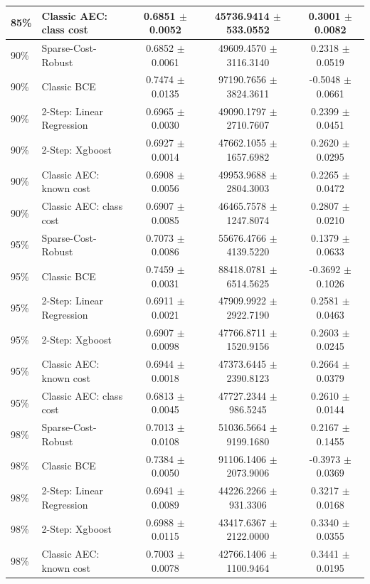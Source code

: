 \begin{tabular}{l l c c c}
85\%  & Classic AEC: class cost & 0.6851 $\pm$ 0.0052 & 45736.9414 $\pm$ 533.0552 & 0.3001 $\pm$ 0.0082 \\
\midrule
90\%  & Sparse-Cost-Robust & 0.6852 $\pm$ 0.0061 & 49609.4570 $\pm$ 3116.3140 & 0.2318 $\pm$ 0.0519 \\
90\%  & Classic BCE & 0.7474 $\pm$ 0.0135 & 97190.7656 $\pm$ 3824.3611 & -0.5048 $\pm$ 0.0661 \\
90\%  & 2-Step: Linear Regression & 0.6965 $\pm$ 0.0030 & 49090.1797 $\pm$ 2710.7607 & 0.2399 $\pm$ 0.0451 \\
90\%  & 2-Step: Xgboost & 0.6927 $\pm$ 0.0014 & 47662.1055 $\pm$ 1657.6982 & 0.2620 $\pm$ 0.0295 \\
90\%  & Classic AEC: known cost & 0.6908 $\pm$ 0.0056 & 49953.9688 $\pm$ 2804.3003 & 0.2265 $\pm$ 0.0472 \\
90\%  & Classic AEC: class cost & 0.6907 $\pm$ 0.0085 & 46465.7578 $\pm$ 1247.8074 & 0.2807 $\pm$ 0.0210 \\
\midrule
95\%  & Sparse-Cost-Robust & 0.7073 $\pm$ 0.0086 & 55676.4766 $\pm$ 4139.5220 & 0.1379 $\pm$ 0.0633 \\
95\%  & Classic BCE & 0.7459 $\pm$ 0.0031 & 88418.0781 $\pm$ 6514.5625 & -0.3692 $\pm$ 0.1026 \\
95\%  & 2-Step: Linear Regression & 0.6911 $\pm$ 0.0021 & 47909.9922 $\pm$ 2922.7190 & 0.2581 $\pm$ 0.0463 \\
95\%  & 2-Step: Xgboost & 0.6907 $\pm$ 0.0098 & 47766.8711 $\pm$ 1520.9156 & 0.2603 $\pm$ 0.0245 \\
95\%  & Classic AEC: known cost & 0.6944 $\pm$ 0.0018 & 47373.6445 $\pm$ 2390.8123 & 0.2664 $\pm$ 0.0379 \\
95\%  & Classic AEC: class cost & 0.6813 $\pm$ 0.0045 & 47727.2344 $\pm$ 986.5245 & 0.2610 $\pm$ 0.0144 \\
\midrule
98\%  & Sparse-Cost-Robust & 0.7013 $\pm$ 0.0108 & 51036.5664 $\pm$ 9199.1680 & 0.2167 $\pm$ 0.1455 \\
98\%  & Classic BCE & 0.7384 $\pm$ 0.0050 & 91106.1406 $\pm$ 2073.9006 & -0.3973 $\pm$ 0.0369 \\
98\%  & 2-Step: Linear Regression & 0.6941 $\pm$ 0.0089 & 44226.2266 $\pm$ 931.3306 & 0.3217 $\pm$ 0.0168 \\
98\%  & 2-Step: Xgboost & 0.6988 $\pm$ 0.0115 & 43417.6367 $\pm$ 2122.0000 & 0.3340 $\pm$ 0.0355 \\
98\%  & Classic AEC: known cost & 0.7003 $\pm$ 0.0078 & 42766.1406 $\pm$ 1100.9464 & 0.3441 $\pm$ 0.0195 \\

\end{tabular}
